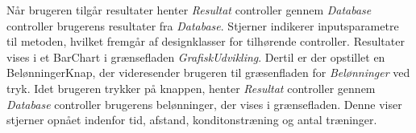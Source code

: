 \noindent 
Når brugeren tilgår resultater henter \textit{Resultat} controller gennem \textit{Database} controller brugerens resultater fra \textit{Database}. Stjerner indikerer inputsparametre til metoden, hvilket fremgår af designklasser for tilhørende controller. Resultater vises i et BarChart i grænsefladen \textit{GrafiskUdvikling}. Dertil er der opstillet en BelønningerKnap, der videresender brugeren til græsenfladen for \textit{Belønninger} ved tryk. Idet brugeren trykker på knappen, henter \textit{Resultat} controller gennem \textit{Database} controller brugerens belønninger, der vises i grænsefladen. Denne viser stjerner opnået indenfor tid, afstand, konditonstræning og antal træninger.

